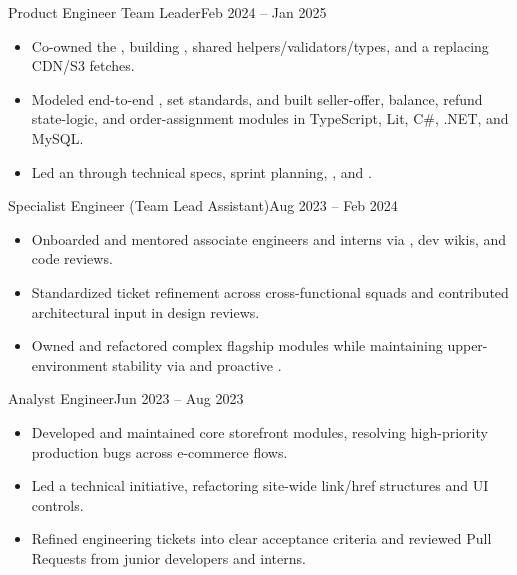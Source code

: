 \begin{TimelineRole}{Product Engineer Team Leader}{Feb 2024 – Jan 2025}
    \begin{itemize}
        \item Co-owned the , building , shared helpers/validators/types, and a  replacing CDN/S3 fetches.
        \item Modeled end-to-end , set  standards, and built seller-offer, balance, refund state-logic, and order-assignment modules in TypeScript, Lit, C\#, .NET, and MySQL.
        \item Led an  through technical specs, sprint planning, , and .
    \end{itemize}
\end{TimelineRole}

\begin{TimelineRole}[last]{Specialist Engineer (Team Lead Assistant)}{Aug 2023 – Feb 2024}
    \begin{itemize}
        \item Onboarded and mentored associate engineers and interns via , dev wikis, and code reviews.
        \item Standardized ticket refinement across cross-functional squads and contributed architectural input in design reviews.
        \item Owned and refactored complex flagship modules while maintaining upper-environment stability via  and proactive .
    \end{itemize}
\end{TimelineRole}

\newpage
{}

\begin{TimelineRole}[last]{Analyst Engineer}{Jun 2023 – Aug 2023}
    \begin{itemize}
        \item Developed and maintained core storefront modules, resolving high-priority production bugs across e-commerce flows.
        \item Led a technical  initiative, refactoring site-wide link/href structures and UI controls.
        \item Refined engineering tickets into clear acceptance criteria and reviewed Pull Requests from junior developers and interns.
    \end{itemize}
\end{TimelineRole}

